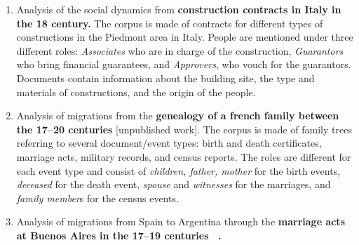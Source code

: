 \newcommand{\pascal}{\#1\xspace}
\newcommand{\nicole}{\#2\xspace}
\newcommand{\zacarias}{\#3\xspace}
\newcommand{\dana}{\#4\xspace}
\newcommand{\myindent}{~~} %
\begin{enumerate}[nosep,leftmargin=*]
    \item Analysis of the social dynamics from \textbf{construction contracts in Italy in the 18 century\cite{cristofoli2018, Rolla2018}.}
    The corpus is made of contracts for different types of constructions in the Piedmont area in Italy. People are mentioned under three different roles: \textit{Associates} who are in charge of the construction, \textit{Guarantors} who bring financial guarantees, and \textit{Approvers}, who vouch for the guarantors. Documents contain information about the building site, the type and materials of constructions, and the origin of the people.
    \item Analysis of migrations from the \textbf{genealogy of a french family between the 17--20 centuries} [unpublished work].
    The corpus is made of family trees referring to several document/event types: birth and death certificates, marriage acts, military records, and census reports.
    The roles are different for each event type and consist of \textit{children, father, mother} for the birth events, \textit{deceased} for the death event, \textit{spouse} and \textit{witnesses} for the marriages, and \textit{family member}s for the census events.
    \item Analysis of migrations from Spain to Argentina through the \textbf{marriage acts at Buenos Aires in the 17--19 centuries ~\cite{moutoukias2016buenos, rueda1989matrimonios}.}

\end{enumerate}
